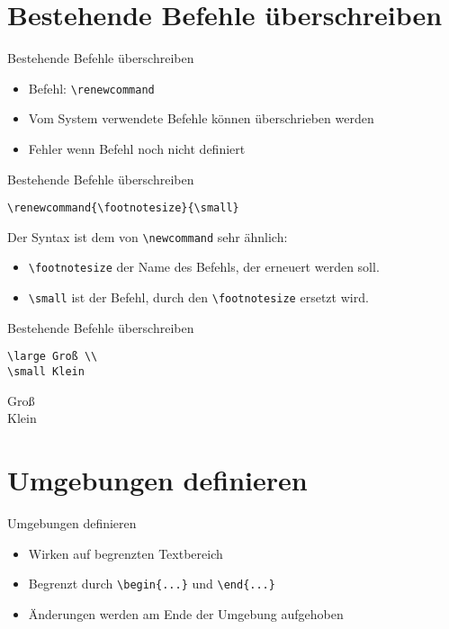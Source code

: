 \documentclass[10pt,a4paper, ngerman]{beamer}
\begin{document}
\section{Bestehende Befehle überschreiben}
\begin{frame}[fragile]{Bestehende Befehle überschreiben}
\begin{itemize}
\item Befehl: \lstinline|\renewcommand|
\pause
\item Vom System verwendete Befehle können überschrieben werden
\item Fehler wenn Befehl noch nicht definiert
\end{itemize}
\end{frame}

\begin{frame}[fragile]{Bestehende Befehle überschreiben}
\begin{lstlisting}[caption = kleine Fußnoten]
% Setze die größe der Fußnoten auf klein
\renewcommand{\footnotesize}{\small}
\end{lstlisting}
\pause
Der Syntax ist dem von \lstinline|\newcommand| sehr ähnlich:
\begin{itemize}
\item \lstinline|\footnotesize| der Name des Befehls, der erneuert werden soll. \pause
\item \lstinline|\small| ist der Befehl, durch den \lstinline|\footnotesize| ersetzt wird. 
\end{itemize}
\end{frame}

\begin{frame}[fragile]{Bestehende Befehle überschreiben}
\begin{lstlisting}[caption = groß und klein]
\large Groß \\
\small Klein
\end{lstlisting}
\begin{hlbox}
\large Groß \\
\small Klein
\end{hlbox}
\end{frame}

\section{Umgebungen definieren}
\begin{frame}[fragile]{Umgebungen definieren}
\begin{itemize}
\item Wirken auf begrenzten Textbereich \pause
\item Begrenzt durch \lstinline|\begin{...}| und \lstinline|\end{...}| \pause
\item Änderungen werden am Ende der Umgebung aufgehoben  
\end{itemize}
\end{frame}
\end{document}
